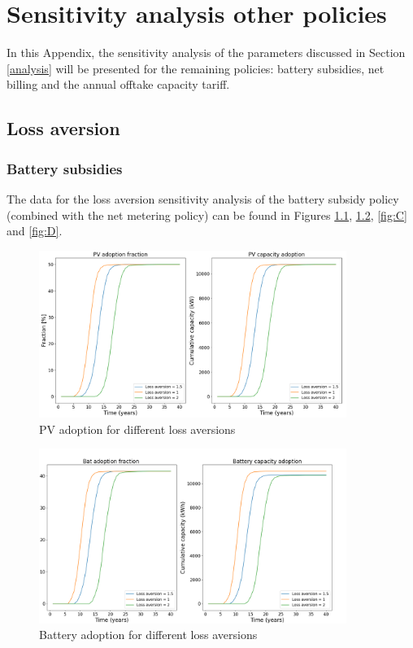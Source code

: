 \chapter{Sensitivity analysis other policies}
\label{app:2}
In this Appendix, the sensitivity analysis of the parameters discussed in Section \ref{analysis} will be presented for the remaining policies: battery subsidies, net billing and the annual offtake capacity tariff. 
\section{Loss aversion}
\subsection{Battery subsidies}
The data for the loss aversion sensitivity analysis of the battery subsidy policy (combined with the net metering policy) can be found in Figures \ref{fig:A}, \ref{fig:B}, \ref{fig:C} and \ref{fig:D}.
\begin{figure}[h!]
    \centering
    \includegraphics[width=10cm]{AppendixA/PVSubsloss.png}
    \caption{PV adoption for different loss aversions}
    \label{fig:A}
\end{figure}
 \begin{figure}[h!]
    \centering
    \includegraphics[width=10cm]{AppendixA/BatSubsloss.png}
    \caption{Battery adoption for different loss aversions}
    \label{fig:B}
\end{figure}
